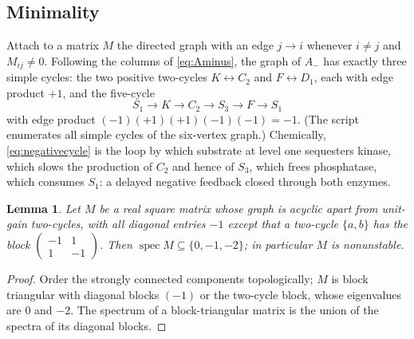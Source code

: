 \documentclass[11pt,a4paper]{article}
\theoremstyle{plain}
\newtheorem{lemma}[theorem]{Lemma}
\theoremstyle{definition}
\theoremstyle{remark}
\newcommand{\Aminus}{A_{-}}
\DeclareMathOperator{\spec}{spec}
\begin{document}
\subsection{Minimality}
Attach to a matrix $M$ the directed graph with an edge $j\to i$ whenever $i\neq j$ and $M_{ij}\neq0$. Following the columns of \eqref{eq:Aminus}, the graph of $\Aminus$ has exactly three simple cycles: the two positive two-cycles $K\leftrightarrow C_2$ and $F\leftrightarrow D_1$, each with edge product $+1$, and the five-cycle
\begin{equation}\label{eq:negativecycle}
S_1\longrightarrow K\longrightarrow C_2\longrightarrow S_3\longrightarrow F\longrightarrow S_1
\end{equation}
with edge product $(-1)(+1)(+1)(-1)(-1)=-1$. (The script enumerates all simple cycles of the six-vertex graph.) Chemically, \eqref{eq:negativecycle} is the loop by which substrate at level one sequesters kinase, which slows the production of $C_2$ and hence of $S_3$, which frees phosphatase, which consumes $S_1$: a delayed negative feedback closed through both enzymes.

\begin{lemma}\label{lem:blocks}
Let $M$ be a real square matrix whose graph is acyclic apart from unit-gain two-cycles, with all diagonal entries $-1$ except that a two-cycle $\{a,b\}$ has the block $\left(\begin{smallmatrix}-1&1\\1&-1\end{smallmatrix}\right)$. Then $\spec M\subseteq\{0,-1,-2\}$; in particular $M$ is nonunstable.
\end{lemma}
\begin{proof}
Order the strongly connected components topologically; $M$ is block triangular with diagonal blocks $(-1)$ or the two-cycle block, whose eigenvalues are $0$ and $-2$. The spectrum of a block-triangular matrix is the union of the spectra of its diagonal blocks.
\end{proof}
\end{document}

